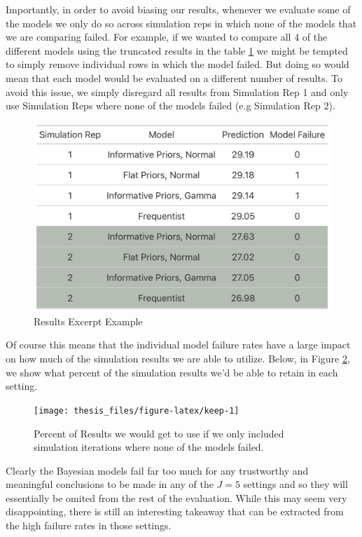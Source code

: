 \documentclass[12pt,twoside]{reedthesis}
\begin{document}
Importantly, in order to avoid biasing our results, whenever we evaluate some of the models we only do so across simulation reps in which none of the models that we are comparing failed. For example, if we wanted to compare all 4 of the different models using the truncated results in the table \ref{fig:tbl} we might be tempted to simply remove individual rows in which the model failed. But doing so would mean that each model would be evaluated on a different number of results. To avoid this issue, we simply disregard all results from Simulation Rep 1 and only use Simulation Reps where none of the models failed (e.g Simulation Rep 2).
\begin{figure}

{\centering \includegraphics[width=0.95\linewidth]{figure/tb1} 

}

\caption{Results Excerpt Example}\label{fig:tbl}
\end{figure}
Of course this means that the individual model failure rates have a large impact on how much of the simulation results we are able to utilize. Below, in Figure \ref{fig:keep}, we show what percent of the simulation results we'd be able to retain in each setting.
\begin{figure}

{\centering \texttt{[image: thesis\_files/figure-latex/keep-1]} 

}

\caption{Percent of Results we would get to use if we only included simulation iterations where none of the models failed.}\label{fig:keep}
\end{figure}
Clearly the Bayesian models fail far too much for any trustworthy and meaningful conclusions to be made in any of the \(J = 5\) settings and so they will essentially be omited from the rest of the evaluation. While this may seem very disappointing, there is still an interesting takeaway that can be extracted from the high failure rates in those settings.
\end{document}
